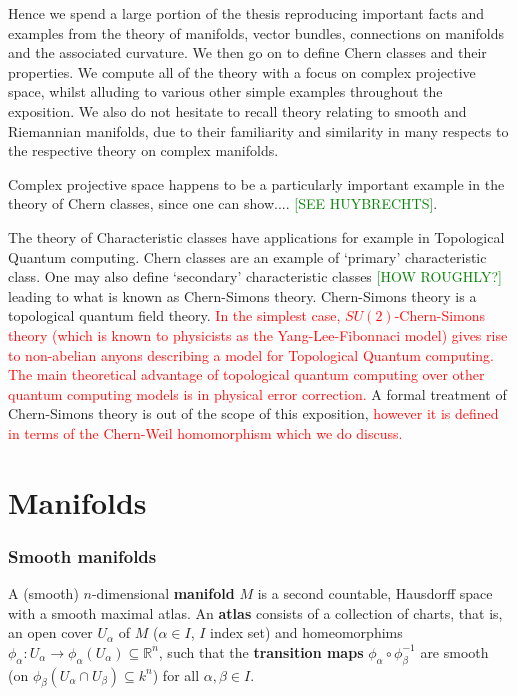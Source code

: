 \documentclass[a4paper]{article}
\theoremstyle{definition} \newtheorem*{definition}{Definition}
\theoremstyle{definition} \newtheorem*{definitions}{Definitions}
\theoremstyle{plain} \newtheorem{theorem}{Theorem}[section]
\theoremstyle{plain} \newtheorem{proposition}[theorem]{Proposition}
\theoremstyle{plain} \newtheorem{corollary}[theorem]{Corollary}
\theoremstyle{plain} \newtheorem{lemma}[theorem]{Lemma}
\theoremstyle{plain} \newtheorem{example}[theorem]{Example}
\newcommand{\checkCorrect}[1]{\textcolor{red}{#1}}
\newcommand{\finish}[1]{\textcolor{green}{#1}}
\newcommand{\defn}[1]{\textbf{#1}}
\newcommand{\realnos}{\mathbb{R}}
\begin{document}
Hence we spend a large portion of the thesis  reproducing important facts and examples from the theory of manifolds, vector bundles, connections on manifolds and the associated curvature. We then go on to define Chern classes and their properties. We compute all of the theory with a focus on complex projective space, whilst alluding to various other simple examples throughout the exposition. We also do not hesitate to recall theory relating to smooth and Riemannian manifolds, due to their familiarity and similarity in many respects to the respective theory on complex manifolds.

Complex projective space happens to be a particularly important example in the theory of Chern classes, since one can show.... \finish{[SEE HUYBRECHTS]}.

The theory of Characteristic classes have applications for example in Topological Quantum computing. Chern classes are an example of `primary' characteristic class. One may also define `secondary' characteristic classes \finish{[HOW ROUGHLY?]} leading to what is known as Chern-Simons theory. Chern-Simons theory is a topological quantum field theory. \checkCorrect{In the simplest case, $SU(2)$-Chern-Simons theory (which is known to physicists as the Yang-Lee-Fibonnaci model) gives rise to non-abelian anyons describing a model for Topological Quantum computing.} \checkCorrect{The main theoretical advantage of topological quantum computing over other quantum computing models is in physical error correction.} A formal treatment of Chern-Simons theory is out of the scope of this exposition, \checkCorrect{however it is defined in terms of the Chern-Weil homomorphism which we do discuss.} 

\section{Manifolds}

\subsubsection{Smooth manifolds}

A (smooth) $n$-dimensional \defn{manifold} $M$ is a second countable, Hausdorff space with a smooth maximal atlas. An \defn{atlas} consists of a collection of charts, that is, an open cover $U_\alpha$ of $M$ ($\alpha\in I$, $I$ index set)  and homeomorphims $\phi_\alpha:U_\alpha \to \phi_\alpha(U_\alpha) \subseteq \realnos^n$, such that the \defn{transition maps} $\phi_\alpha \circ \phi_\beta^{-1}$ are smooth (on $\phi_\beta(U_\alpha \cap U_\beta)\subseteq k^n$) for all $\alpha, \beta\in I$. 
\end{document}

